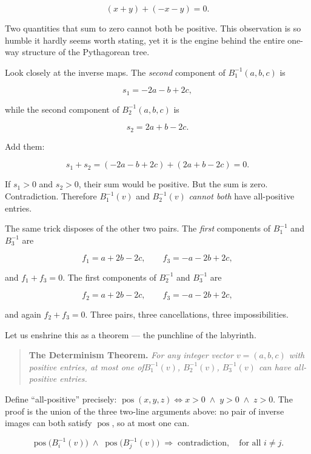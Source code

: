 \[(x + y) + (-x - y) = 0.\]

Two quantities that sum to zero cannot both be positive. This observation is so humble it hardly seems worth stating, yet it is the engine behind the entire one-way structure of the Pythagorean tree.

Look closely at the inverse maps. The \emph{second} component of \(B_1^{-1}(a, b, c)\) is

\[s_1 = -2a - b + 2c,\]

while the second component of \(B_2^{-1}(a, b, c)\) is

\[s_2 = 2a + b - 2c.\]

Add them:

\[s_1 + s_2 = (-2a - b + 2c) + (2a + b - 2c) = 0.\]

If \(s_1 > 0\) and \(s_2 > 0\), their sum would be positive. But the sum is zero. Contradiction. Therefore \(B_1^{-1}(v)\) and \(B_2^{-1}(v)\) \emph{cannot both} have all-positive entries.

The same trick disposes of the other two pairs. The \emph{first} components of \(B_1^{-1}\) and \(B_3^{-1}\) are

\[f_1 = a + 2b - 2c, \qquad f_3 = -a - 2b + 2c,\]

and \(f_1 + f_3 = 0\). The first components of \(B_2^{-1}\) and \(B_3^{-1}\) are

\[f_2 = a + 2b - 2c, \qquad f_3 = -a - 2b + 2c,\]

and again \(f_2 + f_3 = 0\). Three pairs, three cancellations, three impossibilities.

Let us enshrine this as a theorem --- the punchline of the labyrinth.

\begin{quote}
\textbf{The Determinism Theorem.} \emph{For any integer vector \(v = (a, b, c)\) with positive entries, at most one of\(B_1^{-1}(v)\), \(B_2^{-1}(v)\), \(B_3^{-1}(v)\) can have all-positive entries.}
\end{quote}

Define ``all-positive'' precisely: \(\operatorname{pos}(x, y, z) \iff x > 0 \;\wedge\; y > 0 \;\wedge\; z > 0\). The proof is the union of the three two-line arguments above: no pair of inverse images can both satisfy \(\operatorname{pos}\), so at most one can.

\[\operatorname{pos}\!\bigl(B_i^{-1}(v)\bigr) \;\wedge\; \operatorname{pos}\!\bigl(B_j^{-1}(v)\bigr) \;\Longrightarrow\; \text{contradiction}, \quad \text{for all } i \neq j.\]

